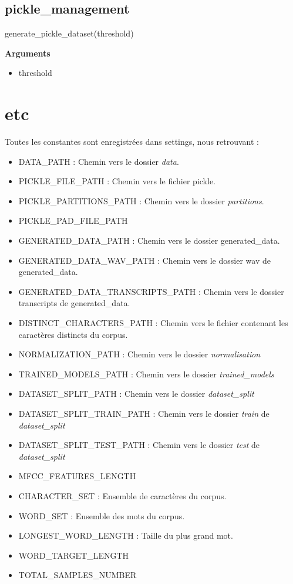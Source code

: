     \subsection{pickle\_management}
    \begin{tcolorbox}
    generate\_pickle\_dataset(threshold)
    \end{tcolorbox}
    \textbf{Arguments}
    \begin{itemize}
        \item threshold
    \end{itemize}
\section{etc}
    Toutes les constantes sont enregistrées dans settings, nous retrouvant :
    \begin{itemize}
        \item DATA\_PATH : Chemin vers le dossier \textit{data}.
        \item PICKLE\_FILE\_PATH : Chemin vers le fichier pickle.
        \item PICKLE\_PARTITIONS\_PATH : Chemin vers le dossier \textit{partitions}.
        \item PICKLE\_PAD\_FILE\_PATH 
        \item GENERATED\_DATA\_PATH : Chemin vers le dossier generated\_data.
        \item GENERATED\_DATA\_WAV\_PATH : Chemin vers le dossier wav de generated\_data.
        \item GENERATED\_DATA\_TRANSCRIPTS\_PATH : Chemin vers le dossier transcripts de generated\_data.
        \item DISTINCT\_CHARACTERS\_PATH : Chemin vers le fichier contenant les caractères distincts du corpus.
        \item NORMALIZATION\_PATH : Chemin vers le dossier \textit{normalisation}
        \item TRAINED\_MODELS\_PATH : Chemin vers le dossier \textit{trained\_models}
        \item DATASET\_SPLIT\_PATH : Chemin vers le dossier \textit{dataset\_split}
        \item DATASET\_SPLIT\_TRAIN\_PATH : Chemin vers le dossier \textit{train } de \textit{dataset\_split}
        \item DATASET\_SPLIT\_TEST\_PATH : Chemin vers le dossier \textit{test} de \textit{dataset\_split}
        \item MFCC\_FEATURES\_LENGTH 
        \item CHARACTER\_SET : Ensemble de caractères du corpus.
        \item WORD\_SET : Ensemble des mots du corpus.
        \item LONGEST\_WORD\_LENGTH : Taille du plus grand mot.
        \item WORD\_TARGET\_LENGTH 
        \item TOTAL\_SAMPLES\_NUMBER
    \end{itemize}